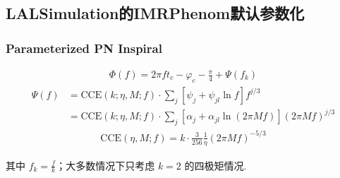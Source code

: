 \documentclass[CJK]{paper}  %
\begin{document}
\subsection{LALSimulation的IMRPhenom默认参数化}

\subsubsection{Parameterized PN Inspiral}

\begin{tcolorbox}
	\begin{align}
		\Phi(f) = 2\pi ft_c - \varphi_c - \frac{\pi}{4} + \Psi(f_k)
	\end{align}
	\begin{align}
		\Psi(f) &= \text{CCE}(k;\eta,M;f) \cdot \sum_j \left[ \psi_j + \psi_{jl} \ln{f} \right] f^{j/3}\\
				&= \text{CCE}(k;\eta,M;f) \cdot \sum_j \left[ \alpha_j + \alpha_{jl} \ln{(2\pi Mf)} \right] (2\pi Mf)^{j/3}
	\end{align}
	\begin{align}
		\text{CCE}(\eta,M;f) = k \cdot \frac{3}{256}\frac{1}{\eta}(2\pi Mf)^{-5/3}
	\end{align}
	\par 其中 $f_k = \frac{f}{k}$；大多数情况下只考虑 $k = 2$ 的四极矩情况.
\end{tcolorbox}
\end{document}
